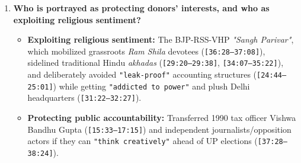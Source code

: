 \documentclass[10pt,a4paper]{article}
\begin{document}
\begin{enumerate}[leftmargin=1.6em, itemsep=4pt, topsep=4pt]
\begin{itemize}[leftmargin=1.4em, itemsep=2pt, topsep=2pt]
    \item \textbf{Distinguishes classical Hinduism from Sangh Parivar political Hindutva:} Mukhopadhyay emphasizes that established Hindu spiritual heads (\texttt{Shankaracharyas} / traditional \textit{acharyas} and \textit{akhadas} in Varanasi, Mathura, Haridwar) were deliberately \texttt{"kept out"} by the Sangh Parivar when constructing \texttt{"Ayodhya the Hindu Vatican"} (\texttt{[34:07--35:22]}), framing the scandal as a crisis of \textit{Sangh Parivar real-estate/corporate Hindutva} (\texttt{[26:14--26:32]}), not traditional Hindu spirituality.
  \end{itemize}
  \item \textbf{Who is portrayed as protecting donors' interests, and who as exploiting religious sentiment?}
  \begin{itemize}[leftmargin=1.4em, itemsep=2pt, topsep=2pt]
    \item \textbf{Exploiting religious sentiment:} The BJP-RSS-VHP \textit{"Sangh Parivar"}, which mobilized grassroots \textit{Ram Shila} devotees (\texttt{[36:28--37:08]}), sidelined traditional Hindu \textit{akhadas} (\texttt{[29:20--29:38]}, \texttt{[34:07--35:22]}), and deliberately avoided \texttt{"leak-proof"} accounting structures (\texttt{[24:44--25:01]}) while getting \texttt{"addicted to power"} and plush Delhi headquarters (\texttt{[31:22--32:27]}).
    \item \textbf{Protecting public accountability:} Transferred 1990 tax officer Vishwa Bandhu Gupta (\texttt{[15:33--17:15]}) and independent journalists/opposition actors if they can \texttt{"think creatively"} ahead of UP elections (\texttt{[37:28--38:24]}).
  \end{itemize}
\end{enumerate}
\end{document}
